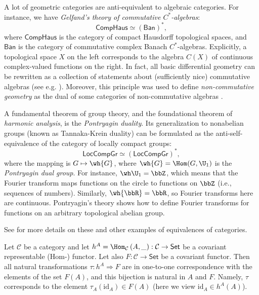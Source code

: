 %
\begin{example}
    A lot of geometric categories are anti-equivalent to algebraic categories.
    For instance, we have \emph{Gelfand's theory of commutative $C^{\ast}$-algebras}:
    \[
    \mathsf{CompHaus}\simeq\left(\mathsf{Ban}\right)^{\ast},
    \]
    where $\mathsf{CompHaus}$ is the category of compact Hausdorff topological
    spaces, and $\mathsf{Ban}$ is the category of commutative complex
    Banach $C^{\ast}$-algebras. Explicitly, a topological space $X$
    on the left corresponds to the algebra $C\left(X\right)$ of continuous
    complex-valued functions on the right. In fact, all basic differential
    geometry can be rewritten as a collection of statements about (sufficiently nice)
    commutative algebras (see e.g. \cite{JetNest}). Moreover, this principle was used to define \emph{non-commutative geometry} as the dual of some categories of non-commutative algebras \cite{Connes}.
\end{example}
%
\begin{example}
    A fundamental theorem of group theory, and the foundational theorem
    of \emph{harmonic analysis}, is the \emph{Pontryagin duality}.
    Its generalization to nonabelian groups (known as Tannaka-Krein duality)
    can be formulated as the anti-self-equivalence of the category of
    locally compact groups:
    \[
    \mathsf{LocCompGr}\simeq\left(\mathsf{LocCompGr}\right)^{\ast},
    \]
    where the mapping is $G\mapsto\wh{G}$, where $\wh{G}=\Hom(G,\U_1)$ is the \emph{Pontryagin dual group}.  For instance, $\wh\U_1=\bbZ$, which means that the
    Fourier transform maps functions on the circle to functions on $\bbZ$
    (i.e., sequences of numbers). Similarly, $\wh{\bbR }=\bbR $,
    so Fourier transforms here are continuous. Pontryagin's theory shows
    how to define Fourier transforms for functions on an arbitrary topological
    abelian group.

    See \cite[\S II.2]{GelMan} for more details on these and other examples
    of equivalences of categories.
\end{example}
\begin{thm}\label{Yoneda}
    Let $\mathcal{C}$ be a category and let $h^{A}=\Hom_{\mathcal{C}}\left(A,\_\right):\mathcal{C}\to\mathsf{Set}$
    be a covariant representable (Hom-) functor. Let also $F:\mathcal{C}\to\mathsf{Set}$
    be a covariant functor. Then all natural transformations $\tau:h^{A}\Longrightarrow F$
    are in one-to-one correspondence with the elements of the set $F(A)$,
    and this bijection is natural in $A$ and $F$. Namely, $\tau$ corresponds to the element $\tau_A(\mathrm{id}_A)\in F(A)$ (here we view $\mathrm{id}_A\in h^A(A)$).
\end{thm}
